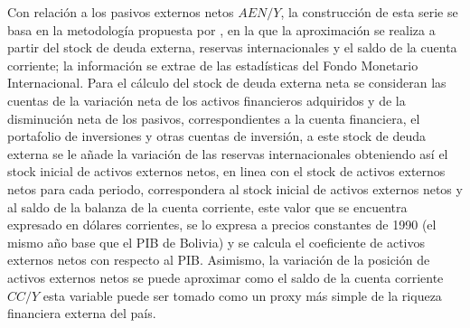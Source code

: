 \documentclass[12pt,letterpaper]{article}
\begin{document}
Con relación a los pasivos externos netos $AEN/Y$, la construcción de esta serie se basa en la metodología propuesta por \cite{lane2001wealth}, en la que la aproximación se realiza a partir del stock de deuda externa, reservas internacionales y el saldo de la cuenta corriente; la información se extrae de las estadísticas del Fondo Monetario Internacional. Para el cálculo del stock de deuda externa neta se consideran las cuentas de la variación neta de los activos financieros adquiridos y de la disminución neta de los pasivos, correspondientes a la cuenta financiera, el portafolio de inversiones y otras cuentas de inversión, a este stock de deuda externa se le añade la variación de las reservas internacionales obteniendo así el stock inicial de activos externos netos, en linea con \cite{lane2001wealth} el stock de activos externos netos para cada periodo, correspondera al stock inicial de activos externos netos y al saldo de la balanza de la cuenta corriente, este valor que se encuentra expresado en dólares corrientes, se lo expresa a precios constantes de 1990 (el mismo año base que el PIB de Bolivia) y se calcula el coeficiente de activos externos netos con respecto al PIB. Asimismo, la variación de la posición de activos externos netos se puede aproximar como el saldo de la cuenta corriente $CC/Y$ esta variable puede ser tomado como un proxy más simple de la riqueza financiera externa del país. 
\end{document}
